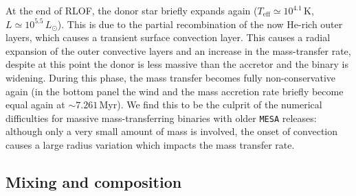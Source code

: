 \documentclass[twocolumn,twocolappendix,trackchanges]{aastex63}
\begin{document}




At the end of RLOF, the donor star briefly expands again
($T_\mathrm{eff}\simeq10^{4.1}$\,K, $L\simeq10^{5.5}\,L_\odot$). This
is due to the partial recombination of the now He-rich outer layers,
which causes a transient surface convection layer. This causes a
radial expansion of the outer convective layers and an increase in the
mass-transfer rate, despite at this point the donor is less massive
than the accretor and the binary is widening.  During this phase, the
mass transfer becomes fully non-conservative again (in the bottom
panel the wind and the mass accretion rate briefly become equal again
at $\sim7.261$\,Myr). We find this to be the culprit of the numerical
difficulties for massive mass-transferring binaries with older
\texttt{MESA} releases: although only a very small amount of mass is
involved, the onset of convection causes a large radius variation
which impacts the mass transfer rate.

\subsection{Mixing and composition}
\label{sec:mixing}
\end{document}
